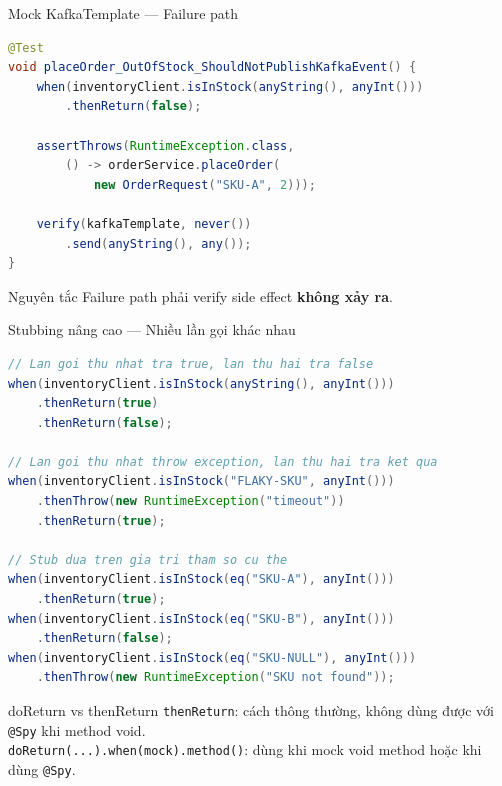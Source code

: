 \documentclass[aspectratio=169,10pt]{beamer}
\begin{document}
\begin{frame}[fragile]{Mock KafkaTemplate --- Failure path}
\begin{lstlisting}[language=java]
@Test
void placeOrder_OutOfStock_ShouldNotPublishKafkaEvent() {
    when(inventoryClient.isInStock(anyString(), anyInt()))
        .thenReturn(false);

    assertThrows(RuntimeException.class,
        () -> orderService.placeOrder(
            new OrderRequest("SKU-A", 2)));

    verify(kafkaTemplate, never())
        .send(anyString(), any());
}
\end{lstlisting}

  \begin{exampleblock}{Nguyên tắc}
    Failure path phải verify side effect \textbf{không xảy ra}.
  \end{exampleblock}
\end{frame}

\begin{frame}[fragile]{Stubbing nâng cao --- Nhiều lần gọi khác nhau}
\begin{lstlisting}[language=java]
// Lan goi thu nhat tra true, lan thu hai tra false
when(inventoryClient.isInStock(anyString(), anyInt()))
    .thenReturn(true)
    .thenReturn(false);

// Lan goi thu nhat throw exception, lan thu hai tra ket qua
when(inventoryClient.isInStock("FLAKY-SKU", anyInt()))
    .thenThrow(new RuntimeException("timeout"))
    .thenReturn(true);

// Stub dua tren gia tri tham so cu the
when(inventoryClient.isInStock(eq("SKU-A"), anyInt()))
    .thenReturn(true);
when(inventoryClient.isInStock(eq("SKU-B"), anyInt()))
    .thenReturn(false);
when(inventoryClient.isInStock(eq("SKU-NULL"), anyInt()))
    .thenThrow(new RuntimeException("SKU not found"));
\end{lstlisting}

  \begin{block}{doReturn vs thenReturn}
    \texttt{thenReturn}: cách thông thường, không dùng được với \texttt{@Spy} khi method void.\\
    \texttt{doReturn(...).when(mock).method()}: dùng khi mock void method hoặc khi dùng \texttt{@Spy}.
  \end{block}
\end{frame}
\end{document}
